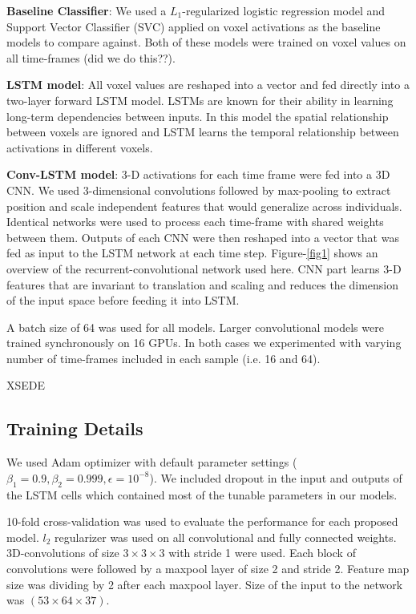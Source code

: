 \documentclass{article} %
\begin{document}
\textbf{Baseline Classifier}: We used a $L_1$-regularized logistic regression model and Support Vector Classifier (SVC) applied on voxel activations as the baseline models to compare against. Both of these models were trained on voxel values on all time-frames (did we do this??). 

\textbf{LSTM model}: All voxel values are reshaped into a vector and fed directly into a two-layer forward LSTM model. LSTMs are known for their ability in learning long-term dependencies between inputs. In this model the spatial relationship between voxels are ignored and LSTM learns the temporal relationship between activations in different voxels. 

\textbf{Conv-LSTM model}: 3-D activations for each time frame were fed into a 3D CNN. We used 3-dimensional convolutions followed by max-pooling to extract position and scale independent features that would generalize across individuals. Identical networks were used to process each time-frame with shared weights between them. Outputs of each CNN were then reshaped into a vector that was fed as input to the LSTM network at each time step. Figure-\ref{fig1} shows an overview of the recurrent-convolutional network used here. CNN part learns 3-D features that are invariant to translation and scaling and reduces the dimension of the input space before feeding it into LSTM. 

A batch size of 64 was used for all models. Larger convolutional models were trained synchronously on 16 GPUs. In both cases we experimented with varying number of time-frames included in each sample (i.e. 16 and 64).

XSEDE \citep{Towns2014}

\subsection{Training Details}
\label{training_details}
We used Adam optimizer with default parameter settings ($\beta_1=0.9, \beta_2=0.999, \epsilon=10^{-8}$). We included dropout in the input and outputs of the LSTM cells \citep{Zaremba2014} which contained most of the tunable parameters in our models. 

10-fold cross-validation was used to evaluate the performance for each proposed model. $l_2$ regularizer was used on all convolutional and fully connected weights. 
3D-convolutions of size $3\times3\times3$ with stride 1 were used. Each block of convolutions were followed by a maxpool layer of size 2 and stride 2. Feature map size was dividing by 2 after each maxpool layer. Size of the input to the network was $(53\times64\times37)$.
\end{document}
